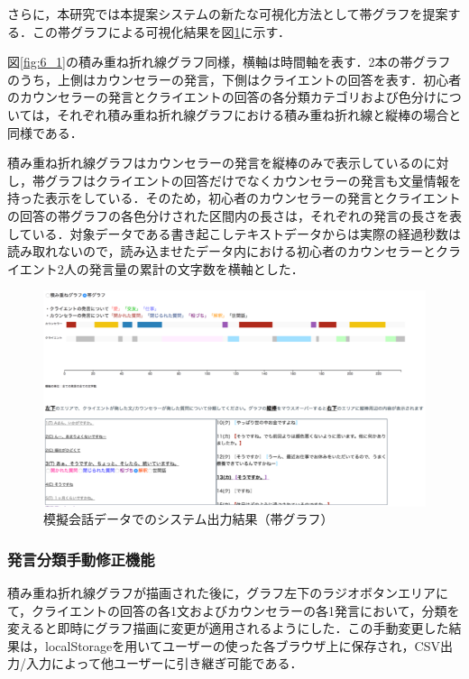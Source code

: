 \documentclass[shuuron]{kuee}
\begin{document}


さらに，本研究では本提案システムの新たな可視化方法として帯グラフを提案する．この帯グラフによる可視化結果を図\ref{fig:obi}に示す．

図\ref{fig:6_1}の積み重ね折れ線グラフ同様，横軸は時間軸を表す．2本の帯グラフのうち，上側はカウンセラーの発言，下側はクライエントの回答を表す．初心者のカウンセラーの発言とクライエントの回答の各分類カテゴリおよび色分けについては，それぞれ積み重ね折れ線グラフにおける積み重ね折れ線と縦棒の場合と同様である．

積み重ね折れ線グラフはカウンセラーの発言を縦棒のみで表示しているのに対し，帯グラフはクライエントの回答だけでなくカウンセラーの発言も文量情報を持った表示をしている．そのため，初心者のカウンセラーの発言とクライエントの回答の帯グラフの各色分けされた区間内の長さは，それぞれの発言の長さを表している．対象データである書き起こしテキストデータからは実際の経過秒数は読み取れないので，読み込ませたデータ内における初心者のカウンセラーとクライエント2人の発言量の累計の文字数を横軸とした．

\begin{figure}
  \begin{center}
    \includegraphics[width=\linewidth]{obi.png}
  \end{center}
  \caption{模擬会話データでのシステム出力結果（帯グラフ）}
  \label{fig:obi}
\end{figure}

\subsubsection{発言分類手動修正機能}
積み重ね折れ線グラフが描画された後に，グラフ左下のラジオボタンエリアにて，クライエントの回答の各1文およびカウンセラーの各1発言において，分類を変えると即時にグラフ描画に変更が適用されるようにした．この手動変更した結果は，localStorageを用いてユーザーの使った各ブラウザ上に保存され，CSV出力/入力によって他ユーザーに引き継ぎ可能である．
\end{document}
